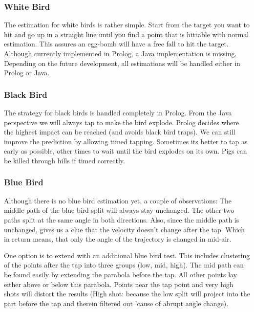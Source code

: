 \subsubsection{White Bird}

The estimation for white birds is rather simple. Start from the target you want to hit and go up in a straight line until you find a point that is hittable with normal estimation. This assures an egg-bomb will have a free fall to hit the target. Although currently implemented in Prolog, a Java implementation is missing. Depending on the future development, all estimations will be handled either in Prolog or Java.


\subsubsection{Black Bird}

The strategy for black birds is handled completely in Prolog. From the Java perspective we will always tap to make the bird explode. Prolog decides where the highest impact can be reached (and avoids black bird traps). We can still improve the prediction by allowing timed tapping. Sometimes its better to tap as early as possible, other times to wait until the bird explodes on its own. Pigs can be killed through hills if timed correctly.


\subsubsection{Blue Bird}

Although there is no blue bird estimation yet, a couple of observations: The middle path of the blue bird split will always stay unchanged. The other two paths split at the same angle in both directions. Also, since the middle path is unchanged, gives us a clue that the velocity doesn't change after the tap. Which in return means, that only the angle of the trajectory is changed in mid-air.

One option is to extend  with an additional blue bird test. This includes clustering of the points after the tap into three groups (low, mid, high). The mid path can be found easily by extending the parabola before the tap. All other points lay either above or below this parabola. Points near the tap point and very high shots will distort the results (High shot: because the low split will project into the part before the tap and therein filtered out 'cause of abrupt angle change).

